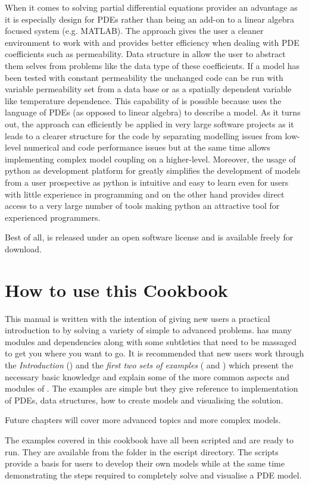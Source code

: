 When it comes to solving partial differential equations \esc provides an advantage as it is especially design for PDEs rather than being an add-on to a linear algebra focused system (e.g. MATLAB). The \esc approach gives the user a cleaner environment to work with and provides better efficiency when dealing with PDE coefficients such as permeability. Data structure in \esc allow the user to abstract them selves from problems like the data type of these coefficients. If a model has been tested with constant permeability the unchanged code can be run with variable permeability set from a data base or as a spatially dependent variable like temperature dependence. This capability of \esc is possible because \esc uses the language of PDEs (as opposed to linear algebra) to describe a model. As it turns out, the \esc approach can efficiently be applied in very large software projects as it leads to a clearer structure for the code by separating modelling issues from low-level numerical and code performance issues but at the same time allows implementing complex model coupling on a higher-level. Moreover, the usage of python as development platform for \esc greatly simplifies the development of models from a user prospective as python is intuitive and easy to learn even for users with little experience in programming and on the other hand provides direct access to a very large number of tools making python an attractive tool for experienced programmers.    

Best of all, \esc is released under an open software license and is available freely for download.

\section{How to use this Cookbook}
This manual is written with the intention of giving new users a practical introduction to \esc by solving a variety of simple to advanced problems. \esc has many modules and dependencies along with some subtleties that need to be massaged to get you where you want to go. It is recommended that new users work through the \textit{Introduction} () and the \textit{first two sets of examples} ( and ) which present the necessary basic knowledge and explain some of the more common aspects and modules of \esc. The examples are simple but they give reference to implementation of PDEs, data structures, how to create models and visualising the solution.

Future chapters will cover more advanced topics and more complex models.

The examples covered in this cookbook have all been scripted and are ready to run. They are available from the \exf folder in the escript directory. The scripts provide a basis for users to develop their own models while at the same time demonstrating the steps required to completely solve and visualise a PDE model.



